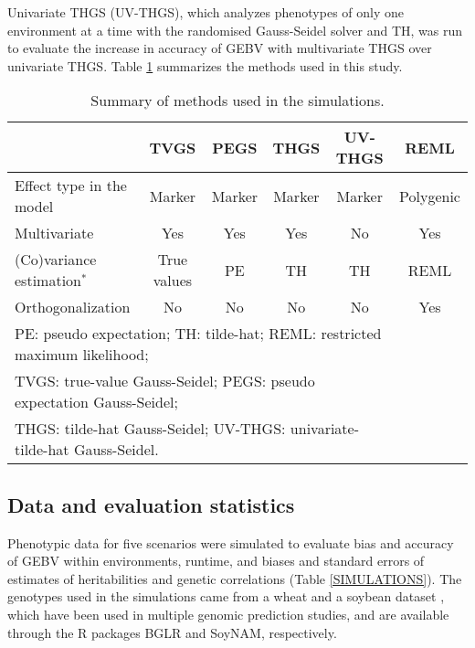 \documentclass{bmcart}
\begin{document}
Univariate THGS (UV-THGS), which analyzes phenotypes of only one environment at a time with the randomised Gauss-Seidel solver and TH, was run to evaluate the increase in accuracy of GEBV with multivariate THGS over univariate THGS. Table \ref{METHODS} summarizes the methods used in this study.
\begin{table}[ht]
\centering
\renewcommand*{\arraystretch}{1.2}
\caption{Summary of methods used in the simulations.}\smallskip
\begin{tabular}{l c c c c c}
\hline
  & TVGS & PEGS & THGS & UV-THGS & REML  \\
\hline
Effect type in the model & Marker & Marker & Marker & Marker & Polygenic \\
Multivariate & Yes & Yes & Yes & No & Yes  \\
(Co)variance estimation$^{*}$ & True values & PE & TH & TH & REML  \\
Orthogonalization & No & No & No & No & Yes  \\
\hline
\multicolumn{5}{l}{\small *PE: pseudo expectation; TH: tilde-hat; REML: restricted maximum likelihood;}\\
\multicolumn{5}{l}{\small
TVGS: true-value Gauss-Seidel; PEGS: pseudo expectation Gauss-Seidel;}\\
\multicolumn{5}{l}{\small THGS: tilde-hat Gauss-Seidel; UV-THGS: univariate-tilde-hat Gauss-Seidel.}
\end{tabular}
\label{METHODS}
\end{table}

\subsection{Data and evaluation statistics}

Phenotypic data for five scenarios were simulated to evaluate bias and accuracy of GEBV within environments, runtime, and biases and standard errors of estimates of heritabilities and genetic correlations (Table \ref{SIMULATIONS}). The genotypes used in the simulations came from a wheat \cite{WheatData1,WheatData2,WheatData3,WheatData4} and a soybean dataset \cite{soynam3,soynam4,Xavier2021}, which have been used in multiple genomic prediction studies, and are available through the R packages BGLR and SoyNAM, respectively.
\end{document}
